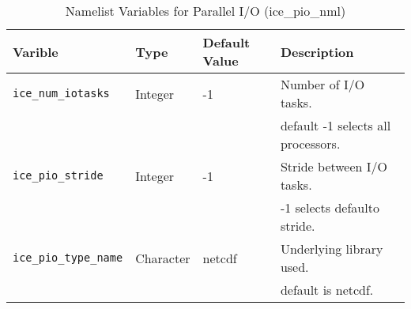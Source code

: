 \begin{table}
  \begin{center}
  \caption{Namelist Variables for Parallel I/O (ice_pio_nml)}
  \label{table:ice_pio_nml}
  \begin{tabular}{p{2.5cm}p{2.5cm}p{3cm}p{6.0cm}} \hline
  Varible & Type & Default Value & Description               \\
\hline \hline

{\tt ice\_num\_iotasks} & Integer & -1 & Number of I/O tasks. \\
                        &         &    & default -1 selects all processors. \\

{\tt ice\_pio\_stride} & Integer & -1 & Stride between I/O tasks. \\
                        &        &    & -1 selects defaulto stride. \\

{\tt ice\_pio\_type\_name} & Character & netcdf & Underlying library used. \\
                        &        &     & default is netcdf. \\

  \hline
  \end{tabular}
  \end{center}
\end{table}
